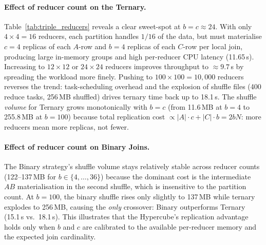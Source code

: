 \documentclass[11pt,a4paper]{article}
\begin{document}
\paragraph{Effect of reducer count on the Ternary.}
Table~\ref{tab:triple_reducers} reveals a clear sweet-spot at $b = c \approx 24$. With only $4 \times 4 = 16$ reducers, each partition handles $1/16$ of the data, but must materialise $c = 4$ replicas of each $A$-row and $b = 4$ replicas of each $C$-row per local join, producing large in-memory groups and high per-reducer CPU latency (11.65\,s). Increasing to $12 \times 12$ or $24 \times 24$ reducers improves throughput to $\approx 9.7$\,s by spreading the workload more finely. Pushing to $100 \times 100 = 10{,}000$ reducers reverses the trend: task-scheduling overhead and the explosion of shuffle files (400 reduce tasks, 256\,MB shuffled) drives ternary time back up to 18.1\,s. The shuffle \emph{volume} for Ternary grows monotonically with $b = c$ (from 11.6\,MB at $b=4$ to 255.8\,MB at $b=100$) because total replication cost $\propto |A| \cdot c + |C| \cdot b = 2bN$: more reducers mean more replicas, not fewer.

\paragraph{Effect of reducer count on Binary Joins.}
The Binary strategy's shuffle volume stays relatively stable across reducer counts (122--137\,MB for $b \in \{4,\ldots,36\}$) because the dominant cost is the intermediate $AB$ materialisation in the second shuffle, which is insensitive to the partition count. At $b = 100$, the binary shuffle rises only slightly to 137\,MB while ternary explodes to 256\,MB, causing the \emph{only} crossover: Binary outperforms Ternary (15.1\,s vs.\ 18.1\,s). This illustrates that the Hypercube's replication advantage holds only when $b$ and $c$ are calibrated to the available per-reducer memory and the expected join cardinality.
\end{document}
